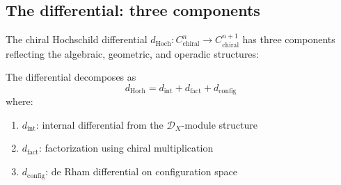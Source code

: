 \subsection{The differential: three components}

The chiral Hochschild differential
$d_{\mathrm{Hoch}}: C^n_{\text{chiral}} \to C^{n+1}_{\text{chiral}}$
has three components reflecting the algebraic, geometric, and operadic
structures:

\begin{theorem}
\label{thm:chiral-hochschild-differential}
The differential decomposes as
\[
d_{\mathrm{Hoch}} = d_{\text{int}} + d_{\text{fact}} + d_{\text{config}}
\]
where:
\begin{enumerate}
\item $d_{\text{int}}$: internal differential from the $\mathcal{D}_X$-module structure
\item $d_{\text{fact}}$: factorization using chiral multiplication
\item $d_{\text{config}}$: de Rham differential on configuration space
\end{enumerate}
\end{theorem}

